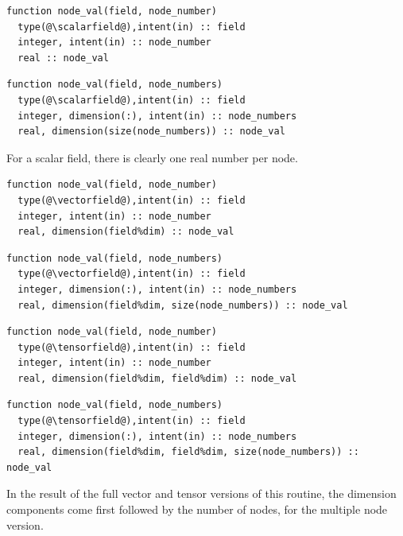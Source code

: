 \documentclass[a4paper, 11pt]{book}
\begin{document}
\begin{lstlisting}
function node_val(field, node_number)
  type(@\scalarfield@),intent(in) :: field
  integer, intent(in) :: node_number
  real :: node_val
\end{lstlisting}
\begin{lstlisting}
function node_val(field, node_numbers)
  type(@\scalarfield@),intent(in) :: field
  integer, dimension(:), intent(in) :: node_numbers
  real, dimension(size(node_numbers)) :: node_val
\end{lstlisting}

For a scalar field, there is clearly one real number per node.

\begin{lstlisting}
function node_val(field, node_number)
  type(@\vectorfield@),intent(in) :: field
  integer, intent(in) :: node_number
  real, dimension(field%dim) :: node_val
\end{lstlisting}
\begin{lstlisting}
function node_val(field, node_numbers)
  type(@\vectorfield@),intent(in) :: field
  integer, dimension(:), intent(in) :: node_numbers
  real, dimension(field%dim, size(node_numbers)) :: node_val
\end{lstlisting}
\begin{lstlisting}
function node_val(field, node_number)
  type(@\tensorfield@),intent(in) :: field
  integer, intent(in) :: node_number
  real, dimension(field%dim, field%dim) :: node_val
\end{lstlisting}
\begin{lstlisting}
function node_val(field, node_numbers)
  type(@\tensorfield@),intent(in) :: field
  integer, dimension(:), intent(in) :: node_numbers
  real, dimension(field%dim, field%dim, size(node_numbers)) :: node_val
\end{lstlisting}
In the result of the full vector and tensor versions of this routine, the
dimension components come first followed by the number of nodes, for the
multiple node version.
\end{document}
